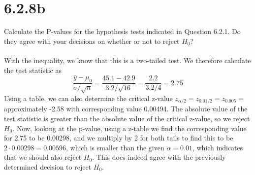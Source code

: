\documentclass{article}
\begin{document}
\thispagestyle{firstpageheader}
{\Large 

\section*{6.2.8b}
Calculate the P-values for the hypothesis tests indicated in Question 6.2.1. Do they agree with your decisions on whether or not to reject \(H_0\)?
\\
\\
With the inequality, we know that this is a two-tailed test. We therefore calculate the test statistic as 
\[
\frac{\bar{y} - \mu_0}{\sigma / \sqrt{n}} = \frac{45.1 - 42.9}{3.2 / \sqrt{16}} = \frac{2.2}{3.2 / 4} = 2.75
\]
Using a table, we can also determine the critical z-value \(z_{\alpha / 2} = z_{0.01 / 2} = z_{0.005} = \) approximately -2.58 with corresponding value 0.00494. The absolute value of the test statistic is greater than the absolute value of the critical z-value, so we reject \(H_0\). Now, looking at the p-value, using a z-table we find the corresponding value for 2.75 to be 0.00298, and we multiply by 2 for both tails to find this to be \(2 \cdot 0.00298 = 0.00596\), which is smaller than the given \(\alpha = 0.01\), which indicates that we should also reject \(H_0\). This does indeed agree with the previously determined decision to reject \(H_0\).

}
\end{document}
